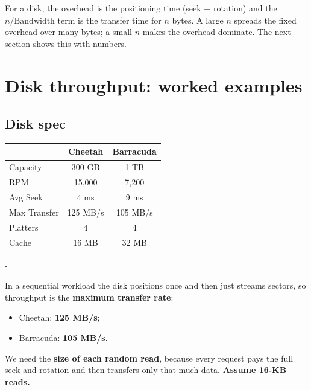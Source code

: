 \documentclass[11pt,a4paper]{article}
\makeatletter
\newcommand{\keepspace}[1]{\par\penalty-100\begingroup
  \setlength{\dimen@}{#1}\dimen@ii\pagegoal\advance\dimen@ii-\pagetotal
  \ifdim\dimen@>\dimen@ii\ifdim\dimen@ii>\z@\vfil\fi\break\fi\endgroup}
\makeatother
\begin{document}
For a disk, the overhead is the positioning time (seek + rotation) and the
\(n/\text{Bandwidth}\) term is the transfer time for \(n\) bytes. A large
\(n\) spreads the fixed overhead over many bytes; a small \(n\) makes the
overhead dominate. The next section shows this with numbers.

\section{Disk throughput: worked examples}

\subsection{Disk spec}

\begin{center}
\renewcommand{\arraystretch}{1.2}
\begin{tabular}{@{}lcc@{}}
  \toprule
   & \textbf{Cheetah} & \textbf{Barracuda} \\
  \midrule
  Capacity     & 300 GB   & 1 TB \\
  RPM          & 15,000   & 7,200 \\
  Avg Seek     & 4 ms     & 9 ms \\
  Max Transfer & 125 MB/s & 105 MB/s \\
  Platters     & 4        & 4 \\
  Cache        & 16 MB    & 32 MB \\
  \bottomrule
\end{tabular}
\end{center}

\keepspace{9\baselineskip}
\begin{quizbox}
In a sequential workload the disk positions once and then just streams
sectors, so throughput is the \textbf{maximum transfer rate}:
\begin{itemize}
  \item Cheetah: \textbf{125 MB/s};
  \item Barracuda: \textbf{105 MB/s}.
\end{itemize}
\end{quizbox}

\begin{quizbox}
We need the \textbf{size of each random read}, because every request pays
the full seek and rotation and then transfers only that much data.
\textbf{Assume 16-KB reads.}
\end{quizbox}
\end{document}
